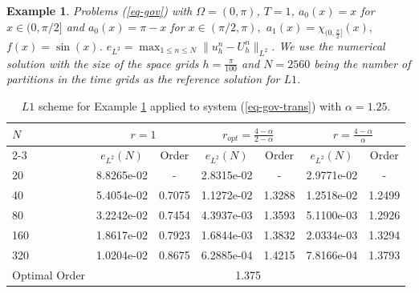 \documentclass[11pt]{article}
\newtheorem{example}{Example}
\numberwithin{equation}{section}
\begin{document}
\fi

\begin{example}\label{ex2}
Problems (\ref{eq-gov}) with $\Omega=(0,\pi)$, $T=1$,
$a_0(x)=x$ for $x\in(0,\pi/2]$ and $a_0(x)=\pi-x$ for $x\in(\pi/2,\pi),$ $a_1(x)=\chi_{(0,\frac{\pi}{2}]}(x),$ $f(x)=\sin(x)$. $e_{L^2}=\max_{1\leq n\leq N}\|u_h^n-U_h^n\|_{L^2}$.
We use the numerical solution with the size of the space grids $h=\frac{\pi}{100}$ and $N=2560$ being the number of partitions in the time grids as the reference solution for $L1$.
\end{example}

\begin{table}[!ht]
\caption{$L1$ scheme for Example \ref{ex2} applied to system (\ref{eq-gov-trans}) with $\alpha=1.25$.}\label{table5}
\renewcommand{\arraystretch}{1}
\def\temptablewidth{0.95\textwidth}
\begin{center}
 \begin{tabular*}{\temptablewidth}{@{\extracolsep{\fill}}lcccccc}\hline
 $N$ &\multicolumn{2}{c}{$r=1$} &\multicolumn{2}{c}{$r_{opt}=\frac{4-\alpha}{2-\alpha}$} &\multicolumn{2}{c}{$r=\frac{4-\alpha}{\alpha}$}    \\
 \cline{2-3}\cline{4-5}\cline{6-7}
 & $e_{L^{2}}(N)$         &Order     &$e_{L^{2}}(N)$    &Order    &$e_{L^{2}}(N)$ &Order     \\ \hline
 20 &8.8265e-02     &-       &2.8315e-02   &-        &2.9771e-02  &-  \\
 40 &5.4054e-02     &0.7075  &1.1272e-02   &1.3288   &1.2518e-02  &1.2499    \\
 80 &3.2242e-02     &0.7454  &4.3937e-03   &1.3593   &5.1100e-03  &1.2926 \\
 160 &1.8617e-02    &0.7923  &1.6844e-03   &1.3832   &2.0334e-03  &1.3294    \\
 320 &1.0204e-02    &0.8675  &6.2885e-04   &1.4215   &7.8166e-04  &1.3793    \\\hline
 Optimal Order  &\multicolumn{6}{c}{1.375} \\ \hline
\end{tabular*}
\end{center}
\end{table}
\end{document}
